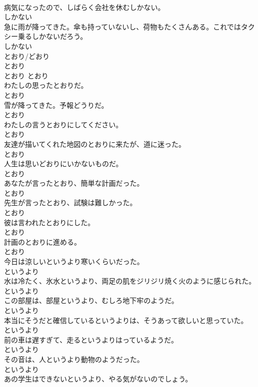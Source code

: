 \documentclass[8pt]{extreport}
\begin{document}
\begin{CJK}{UTF8}{min}
\\	病気になったので、しばらく会社を休むしかない。	
\\	しかない	
\\	急に雨が降ってきた。傘も持っていないし、荷物もたくさんある。これではタクシー乗るしかないだろう。	
\\	しかない	
\\	とおり/どおり	
\\	とおり	
\\	とおり	とおり	
\\	わたしの思ったとおりだ。	
\\	とおり	
\\	雪が降ってきた。予報どうりだ。	
\\	とおり	
\\	わたしの言うとおりにしてください。	
\\	とおり	
\\	友達が描いてくれた地図のとおりに来たが、道に迷った。	
\\	とおり	
\\	人生は思いどおりにいかないものだ。	
\\	とおり	
\\	あなたが言ったとおり、簡単な計画だった。	
\\	とおり	
\\	先生が言ったとおり、試験は難しかった。	
\\	とおり	
\\	彼は言われたとおりにした。	
\\	とおり	
\\	計画のとおりに進める。	
\\	とおり	
\\	今日は涼しいというより寒いくらいだった。	
\\	というより	
\\	水は冷たく、氷水というより、両足の肌をジリジリ焼く火のように感じられた。	
\\	というより	
\\	この部屋は、部屋というより、むしろ地下牢のようだ。	
\\	というより	
\\	本当にそうだと確信しているというよりは、そうあって欲しいと思っていた。	
\\	というより	
\\	前の車は遅すぎて、走るというよりはっているようだ。	
\\	というより	
\\	その音は、人というより動物のようだった。	
\\	というより	
\\	あの学生はできないというより、やる気がないのでしょう。	

\end{CJK}
\end{document}
